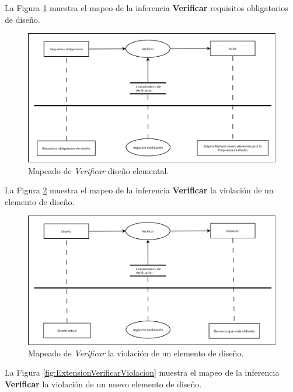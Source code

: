 La Figura \ref{fig:RequisitosObligatoriosVerificarValor} muestra el mapeo de la inferencia \textbf{Verificar} requisitos obligatorios de diseño.

\begin{figure}[H]
  \centering
  \includegraphics[scale=0.35]{imaxes/RequisitosObligatoriosVerificarValor.png}
  \caption{\label{fig:RequisitosObligatoriosVerificarValor}Mapeado de \textit{Verificar} diseño elemental.}
\end{figure}

La Figura \ref{fig:DisenoVerificarViolacion} muestra el mapeo de la inferencia \textbf{Verificar} la violación de un elemento de diseño.

\begin{figure}[H]
  \centering
  \includegraphics[scale=0.35]{imaxes/DisenoVerificarViolacion.png}
  \caption{\label{fig:DisenoVerificarViolacion}Mapeado de \textit{Verificar} la violación de un elemento de diseño.}
\end{figure}

La Figura \ref{fig:ExtensionVerificarViolacion} muestra el mapeo de la inferencia \textbf{Verificar} la violación de un nuevo elemento de diseño.

